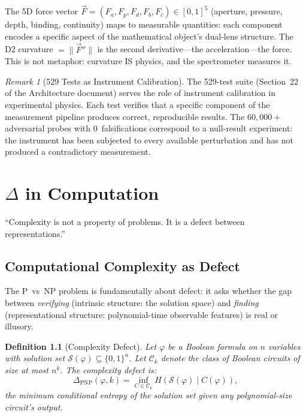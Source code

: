 \documentclass[12pt, openany]{book}
\newtheorem{definition}[theorem]{Definition}
\theoremstyle{remark}
\newtheorem{remark}[theorem]{Remark}
\begin{document}
\noindent
The 5D force vector $\vec{F} = (F_a, F_p, F_d, F_b, F_c) \in [0,1]^5$
(aperture, pressure, depth, binding, continuity) maps to measurable quantities:
each component encodes a specific aspect of the mathematical object's dual-lens
structure.  The D2 curvature $= \|\vec{F}''\|$ is the second derivative---the
acceleration---the force.  This is not metaphor: curvature IS physics, and the
spectrometer measures it.

\begin{remark}[529 Tests as Instrument Calibration]
The 529-test suite (Section~22 of the Architecture document) serves the role
of instrument calibration in experimental physics.  Each test verifies that a
specific component of the measurement pipeline produces correct, reproducible
results.  The $60{,}000{+}$ adversarial probes with 0~falsifications correspond
to a null-result experiment: the instrument has been subjected to every available
perturbation and has not produced a contradictory measurement.
\end{remark}


\chapter{$\Delta$ in Computation}
\label{ch:computation}

\epigraph{``Complexity is not a property of problems. It is a defect between
representations.''}{}

\section{Computational Complexity as Defect}
\label{sec:complexity-defect}

The P~vs~NP problem is fundamentally about defect: it asks whether the gap
between \emph{verifying} (intrinsic structure: the solution space) and
\emph{finding} (representational structure: polynomial-time observable features)
is real or illusory.

\begin{definition}[Complexity Defect]
\label{def:complexity-defect}
Let $\varphi$ be a Boolean formula on $n$ variables with solution set
$\mathcal{S}(\varphi) \subseteq \{0,1\}^n$.  Let $\mathcal{C}_k$ denote the
class of Boolean circuits of size at most $n^k$.  The complexity defect is:
\[
  \Delta_{\mathrm{PNP}}(\varphi, k) = \inf_{C \in \mathcal{C}_k}
  H(\mathcal{S}(\varphi) \mid C(\varphi)),
\]
the minimum conditional entropy of the solution set given any polynomial-size
circuit's output.
\end{definition}
\end{document}
